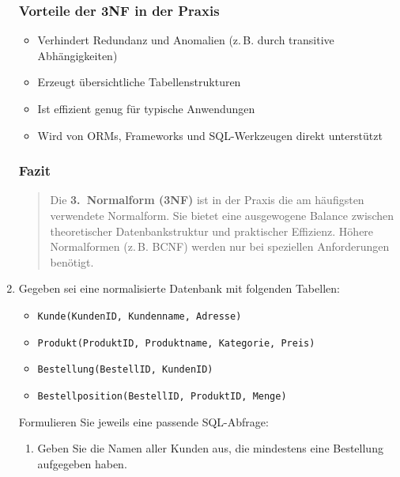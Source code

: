 \documentclass[a4paper,12pt]{article}
\begin{document}
\begin{enumerate}
		\vspace{1em}
		
		\subsubsection*{Vorteile der 3NF in der Praxis}
		
		\begin{itemize}
			\item Verhindert Redundanz und Anomalien (z.\,B. durch transitive Abhängigkeiten)
			\item Erzeugt übersichtliche Tabellenstrukturen
			\item Ist effizient genug für typische Anwendungen
			\item Wird von ORMs, Frameworks und SQL-Werkzeugen direkt unterstützt
		\end{itemize}
		
		\vspace{1em}
		
		\subsubsection*{Fazit}
		
		\begin{quote}
			Die \textbf{3.\ Normalform (3NF)} ist in der Praxis die am häufigsten verwendete Normalform. Sie bietet eine ausgewogene Balance zwischen theoretischer Datenbankstruktur und praktischer Effizienz. Höhere Normalformen (z.\,B. BCNF) werden nur bei speziellen Anforderungen benötigt.
		\end{quote}
		
		\item Gegeben sei eine normalisierte Datenbank mit folgenden Tabellen:
		
		\begin{itemize}
			\item \texttt{Kunde(KundenID, Kundenname, Adresse)}
			\item \texttt{Produkt(ProduktID, Produktname, Kategorie, Preis)}
			\item \texttt{Bestellung(BestellID, KundenID)}
			\item \texttt{Bestellposition(BestellID, ProduktID, Menge)}
		\end{itemize}
		
		Formulieren Sie jeweils eine passende SQL-Abfrage:
		
		\begin{enumerate}
			\item Geben Sie die Namen aller Kunden aus, die mindestens eine Bestellung aufgegeben haben.
			

\end{enumerate}
\end{enumerate}
\end{document}
